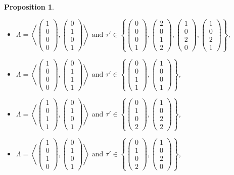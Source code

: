 \documentclass{alggeom}
\newcommand{\vect}[1]{\left( \begin{smallmatrix} #1 \end{smallmatrix} \right)}
\newcommand{\plan}[2]{\left< \vect{ #1 }, \vect{ #2 } \right>}
\theoremstyle{plain}
\newtheorem{prop}[theorem]{Proposition}
\theoremstyle{definition}
\theoremstyle{remark}
\begin{document}
\begin{prop}
\begin{itemize}
\item[(iv)] 
$\Lambda=\plan{1\\0\\0\\0}{0\\1\\0\\1} \text{ and } \tau' \in \left\{ \vect{0\\0\\0\\1},\vect{2\\0\\1\\2},\vect{1\\0\\2\\0},\vect{1\\0\\2\\1} \right\}$,
\item[(v)]
$\Lambda=\plan{1\\0\\0\\0}{0\\1\\1\\1} \text{ and } \tau' \in \left\{ \vect{0\\0\\1\\1},\vect{1\\0\\0\\1} \right\}$,

\item[(vi)] 
$\Lambda=\plan{1\\0\\1\\1}{0\\1\\0\\1} \text{ and } \tau' \in \left\{ \vect{0\\1\\0\\2},\vect{1\\0\\2\\2} \right\}$,

\item[(vii)]
$\Lambda=\plan{1\\0\\1\\0}{0\\1\\0\\1} \text{ and } \tau' \in \left\{ \vect{0\\1\\0\\2},\vect{1\\0\\2\\0} \right\}$,


\end{itemize}
\end{prop}
\end{document}
